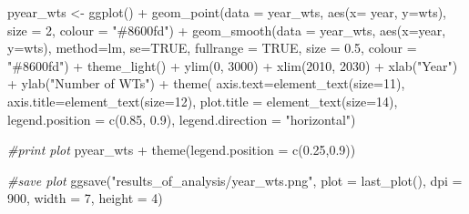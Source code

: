 \documentclass[a4paper,11pt]{article}
\newenvironment{Shaded}{\begin{snugshade}}{\end{snugshade}}
\newcommand{\AttributeTok}[1]{\textcolor[rgb]{0.77,0.63,0.00}{#1}}
\newcommand{\CommentTok}[1]{\textcolor[rgb]{0.56,0.35,0.01}{\textit{#1}}}
\newcommand{\ConstantTok}[1]{\textcolor[rgb]{0.00,0.00,0.00}{#1}}
\newcommand{\DecValTok}[1]{\textcolor[rgb]{0.00,0.00,0.81}{#1}}
\newcommand{\FloatTok}[1]{\textcolor[rgb]{0.00,0.00,0.81}{#1}}
\newcommand{\FunctionTok}[1]{\textcolor[rgb]{0.00,0.00,0.00}{#1}}
\newcommand{\NormalTok}[1]{#1}
\newcommand{\OtherTok}[1]{\textcolor[rgb]{0.56,0.35,0.01}{#1}}
\newcommand{\SpecialCharTok}[1]{\textcolor[rgb]{0.00,0.00,0.00}{#1}}
\newcommand{\StringTok}[1]{\textcolor[rgb]{0.31,0.60,0.02}{#1}}
\begin{document}
\begin{Shaded}
\begin{Highlighting}[]
\NormalTok{pyear\_wts }\OtherTok{\textless{}{-}} \FunctionTok{ggplot}\NormalTok{() }\SpecialCharTok{+}
  \FunctionTok{geom\_point}\NormalTok{(}\AttributeTok{data =}\NormalTok{ year\_wts, }\FunctionTok{aes}\NormalTok{(}\AttributeTok{x=}\NormalTok{ year, }\AttributeTok{y=}\NormalTok{wts), }
             \AttributeTok{size =} \DecValTok{2}\NormalTok{, }\AttributeTok{colour =} \StringTok{"\#8600fd"}\NormalTok{) }\SpecialCharTok{+}
  \FunctionTok{geom\_smooth}\NormalTok{(}\AttributeTok{data =}\NormalTok{ year\_wts, }\FunctionTok{aes}\NormalTok{(}\AttributeTok{x=}\NormalTok{year, }\AttributeTok{y=}\NormalTok{wts), }
              \AttributeTok{method=}\NormalTok{lm, }\AttributeTok{se=}\ConstantTok{TRUE}\NormalTok{, }\AttributeTok{fullrange =} \ConstantTok{TRUE}\NormalTok{, }
              \AttributeTok{size =} \FloatTok{0.5}\NormalTok{, }\AttributeTok{colour =} \StringTok{"\#8600fd"}\NormalTok{)  }\SpecialCharTok{+}
  \FunctionTok{theme\_light}\NormalTok{() }\SpecialCharTok{+}
  \FunctionTok{ylim}\NormalTok{(}\DecValTok{0}\NormalTok{, }\DecValTok{3000}\NormalTok{) }\SpecialCharTok{+}
  \FunctionTok{xlim}\NormalTok{(}\DecValTok{2010}\NormalTok{, }\DecValTok{2030}\NormalTok{) }\SpecialCharTok{+}
  \FunctionTok{xlab}\NormalTok{(}\StringTok{"Year"}\NormalTok{) }\SpecialCharTok{+}
  \FunctionTok{ylab}\NormalTok{(}\StringTok{"Number of WT\textquotesingle{}s"}\NormalTok{) }\SpecialCharTok{+}
  \FunctionTok{theme}\NormalTok{( }\AttributeTok{axis.text=}\FunctionTok{element\_text}\NormalTok{(}\AttributeTok{size=}\DecValTok{11}\NormalTok{),}
         \AttributeTok{axis.title=}\FunctionTok{element\_text}\NormalTok{(}\AttributeTok{size=}\DecValTok{12}\NormalTok{),}
         \AttributeTok{plot.title =} \FunctionTok{element\_text}\NormalTok{(}\AttributeTok{size=}\DecValTok{14}\NormalTok{),}
         \AttributeTok{legend.position =} \FunctionTok{c}\NormalTok{(}\FloatTok{0.85}\NormalTok{, }\FloatTok{0.9}\NormalTok{),}
         \AttributeTok{legend.direction =} \StringTok{"horizontal"}\NormalTok{) }

\CommentTok{\#print plot}
\NormalTok{pyear\_wts }\SpecialCharTok{+} \FunctionTok{theme}\NormalTok{(}\AttributeTok{legend.position =} \FunctionTok{c}\NormalTok{(}\FloatTok{0.25}\NormalTok{,}\FloatTok{0.9}\NormalTok{))}

\CommentTok{\#save plot}
\FunctionTok{ggsave}\NormalTok{(}\StringTok{"results\_of\_analysis/year\_wts.png"}\NormalTok{,}
       \AttributeTok{plot =} \FunctionTok{last\_plot}\NormalTok{(),}
       \AttributeTok{dpi =} \DecValTok{900}\NormalTok{,}
       \AttributeTok{width =} \DecValTok{7}\NormalTok{,}
       \AttributeTok{height =} \DecValTok{4}\NormalTok{)}


\end{Highlighting}
\end{Shaded}
\end{document}
